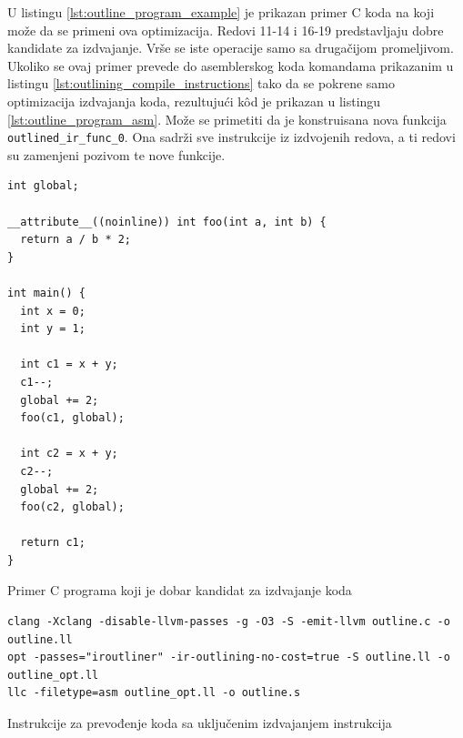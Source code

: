 \documentclass[12pt,oneside]{memoir}
\begin{document}
U listingu \ref{lst:outline_program_example} je prikazan primer C koda na koji može da se primeni ova optimizacija.
Redovi 11-14 i 16-19 predstavljaju dobre kandidate za izdvajanje. Vrše se iste operacije samo sa drugačijom promeljivom.
Ukoliko se ovaj primer prevede do asemblerskog koda komandama prikazanim u listingu \ref{lst:outlining_compile_instructions} tako da se pokrene samo optimizacija izdvajanja koda, rezultujući k\^od je prikazan u listingu \ref{lst:outline_program_asm}.
Može se primetiti da je konstruisana nova funkcija \verb|outlined_ir_func_0|. Ona sadrži sve instrukcije iz izdvojenih redova, a ti redovi su zamenjeni pozivom te nove funkcije.

\begin{listing}[!ht]
\begin{verbatim}
int global;

__attribute__((noinline)) int foo(int a, int b) {
  return a / b * 2;
}

int main() {
  int x = 0;
  int y = 1;
  
  int c1 = x + y;
  c1--;
  global += 2;
  foo(c1, global);
  
  int c2 = x + y;
  c2--;
  global += 2;
  foo(c2, global);
  
  return c1;
}
\end{verbatim}
\caption{Primer C programa koji je dobar kandidat za izdvajanje koda}
\label{lst:outline_program_example}
\end{listing}

\begin{listing}[!ht]
  \begin{verbatim}
clang -Xclang -disable-llvm-passes -g -O3 -S -emit-llvm outline.c -o outline.ll
opt -passes="iroutliner" -ir-outlining-no-cost=true -S outline.ll -o outline_opt.ll
llc -filetype=asm outline_opt.ll -o outline.s
  \end{verbatim}
  \caption{Instrukcije za prevođenje koda sa uključenim izdvajanjem instrukcija}
  \label{lst:outlining_compile_instructions}
\end{listing}
\end{document}

